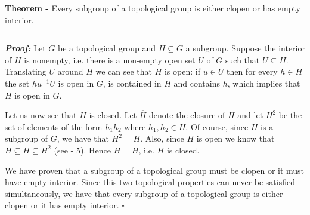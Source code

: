 \documentclass[12pt]{article}
\begin{document}
{\bf Theorem -} Every subgroup of a topological group is either clopen or has empty interior.

$\,$

{\bf \emph{Proof:}} Let $G$ be a topological group and $H \subseteq G$ a subgroup. Suppose the interior of $H$ is nonempty, i.e. there is a non-empty open set $U$ of $G$ such that $U \subseteq H$. Translating $U$ around $H$ we can see that $H$ is open: if $u \in U$ then for every $h \in H$ the set $hu^{-1}U$ is open in $G$, is contained in $H$ and contains $h$, which implies that $H$ is open in $G$.

Let us now see that $H$ is closed. Let $\overline{H}$ denote the closure of $H$ and let $H^2$ be the set of elements of the form $h_1h_2$ where $h_1, h_2 \in H$. Of course, since $H$ is a subgroup of $G$, we have that $H^2=H$. Also, since $H$ is open we know that$ H\subseteq \overline{H} \subseteq H^2$ (see  -  5). Hence $\overline{H}=H$, i.e. $H$ is closed.

We have proven that a subgroup of a topological group must be clopen or it must have empty interior. Since this two topological properties can never be satisfied simultaneously, we have that every subgroup of a topological group is either clopen or it has empty interior. $\square$
\end{document}
